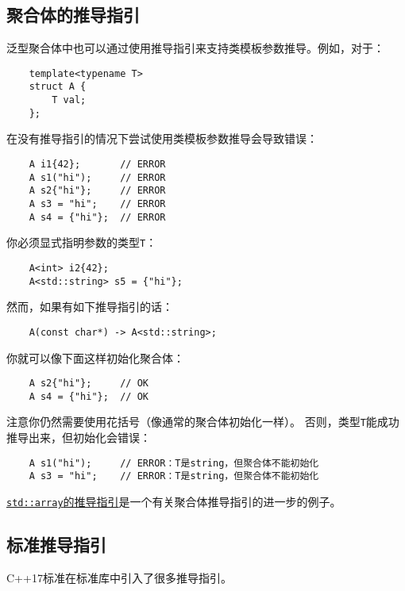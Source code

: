 \subsection{聚合体的推导指引}
泛型聚合体中也可以通过使用推导指引来支持类模板参数推导。例如，对于：
\begin{lstlisting}
    template<typename T>
    struct A {
        T val;
    };
\end{lstlisting}
在没有推导指引的情况下尝试使用类模板参数推导会导致错误：
\begin{lstlisting}
    A i1{42};       // ERROR
    A s1("hi");     // ERROR
    A s2{"hi"};     // ERROR
    A s3 = "hi";    // ERROR
    A s4 = {"hi"};  // ERROR
\end{lstlisting}
你必须显式指明参数的类型\texttt{T}：
\begin{lstlisting}
    A<int> i2{42};
    A<std::string> s5 = {"hi"};
\end{lstlisting}
然而，如果有如下推导指引的话：
\begin{lstlisting}
    A(const char*) -> A<std::string>;
\end{lstlisting}
你就可以像下面这样初始化聚合体：
\begin{lstlisting}
    A s2{"hi"};     // OK
    A s4 = {"hi"};  // OK
\end{lstlisting}
注意你仍然需要使用花括号（像通常的聚合体初始化一样）。
否则，类型\texttt{T}能成功推导出来，但初始化会错误：
\begin{lstlisting}
    A s1("hi");     // ERROR：T是string，但聚合体不能初始化
    A s3 = "hi";    // ERROR：T是string，但聚合体不能初始化
\end{lstlisting}
\hyperref[ch9.2.6.3]{\texttt{std::array}的推导指引}是一个有关聚合体推导指引的进一步的例子。

\subsection{标准推导指引}
C++17标准在标准库中引入了很多推导指引。

